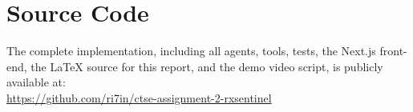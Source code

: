 \documentclass[11pt]{article}
\begin{document}
\section*{Source Code}\label{code}

The complete implementation, including all agents, tools, tests, the
Next.js front-end, the LaTeX source for this report, and the demo
video script, is publicly available at:\\
\url{https://github.com/ri7in/ctse-assignment-2-rxsentinel}
\end{document}
